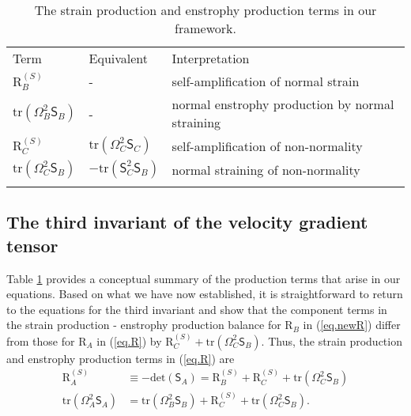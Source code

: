\documentclass[preprint,amssymb,amsmath,aip,cha]{revtex4-1}
\begin{document}
\begin{table}
\caption{The strain  production and enstrophy production terms in our framework.}
\centering
\begin{tabular}{lll}
\noalign{\smallskip}
Term & Equivalent & Interpretation\\
\noalign{\smallskip}%
$\mbox{R}^{(S)}_{B}$ & - & self-amplification of normal strain\\
$\mbox{tr}(\mathsf{\Omega}_{B}^{2}\mathsf{S}_{B})$ & - & normal enstrophy production by normal straining\\
$\mbox{R}^{(S)}_{C}$ & $\mbox{tr}(\mathsf{\Omega}_{C}^{2}\mathsf{S}_{C})$ & self-amplification of non-normality \\
$\mbox{tr}(\mathsf{\Omega}_{C}^{2}\mathsf{S}_{B})$ & $-\mbox{tr}(\mathsf{S}_{C}^{2}\mathsf{S}_{B})$ & normal straining of non-normality \\
\noalign{\smallskip}
\label{table.terms}
\end{tabular}
\end{table}

\subsection{The third invariant of the velocity gradient tensor}
Table \ref{table.terms} provides a conceptual summary of the production terms that arise in our equations. Based on what we have now established, it is straightforward to return to the equations for the third invariant and show that the component terms in the strain production - enstrophy production balance for $\mbox{R}_{B}$ in (\ref{eq.newR}) differ from those for $\mbox{R}_{A}$ in (\ref{eq.R}) by $\mbox{R}^{(S)}_{C} +\mbox{tr}(\mathsf{\Omega}_{C}^{2}\mathsf{S}_{B})$. Thus, the strain production and enstrophy production terms in (\ref{eq.R}) are
\begin{align}
\label{eq.RSA}
\mbox{R}_{A}^{(S)} &\equiv -\mbox{det}(\mathsf{S}_{A}) = \mbox{R}^{(S)}_{B} + \mbox{R}^{(S)}_{C} +\mbox{tr}(\mathsf{\Omega}_{C}^{2}\mathsf{S}_{B}) \\
\mbox{tr}(\mathsf{\Omega}_{A}^{2}\mathsf{S}_{A}) &= \mbox{tr}(\mathsf{\Omega}_{B}^{2}\mathsf{S}_{B}) + \mbox{R}^{(S)}_{C} +\mbox{tr}(\mathsf{\Omega}_{C}^{2}\mathsf{S}_{B}). 
\label{eq.enstroprodA}
\end{align}
\end{document}
